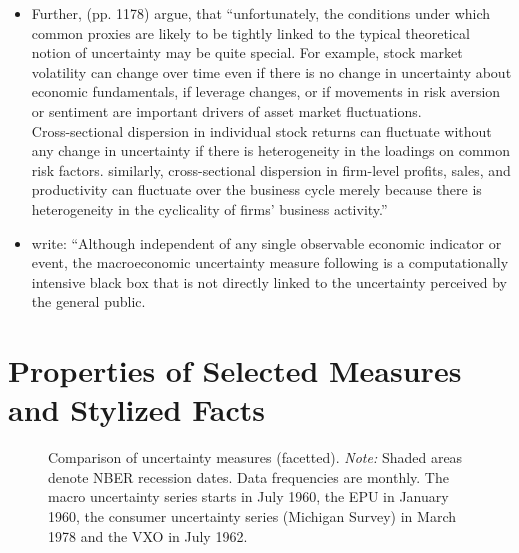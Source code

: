 \documentclass[a4paper,11pt,listof=nochaptergap,oneside,pointednumbers,bibtotoc,bigheadings,liststotoc]{scrbook}
\begin{document}
\begin{itemize}
	\item Further, \citet{juradoetal:15} (pp. 1178) argue, that ``unfortunately, the conditions under which common proxies are likely to be tightly linked to the typical theoretical notion of uncertainty may be quite special. For example, stock market volatility can change over time even if there is no change in uncertainty about economic fundamentals, if leverage changes, or if movements in risk aversion or sentiment are important drivers of asset market fluctuations.\\
Cross-sectional dispersion in individual stock returns can fluctuate without any change in uncertainty if there is heterogeneity in the loadings on common risk factors. similarly, cross-sectional dispersion in firm-level profits, sales, and productivity can fluctuate over the business cycle merely because there is heterogeneity in the cyclicality of firms' business activity.'' 
	\item \citet[p. 13]{bontempietal:16} write: ``Although independent of any single observable economic indicator or event, the macroeconomic uncertainty measure following \citet{juradoetal:15} is a computationally intensive black box that is not directly linked to the uncertainty perceived by the general public.  
\end{itemize}

\section{Properties of Selected Measures and Stylized Facts}
\label{sec:ComparisonOfMeasures}
\begin{figure}[!ht]
   \centering
   \setlength\fboxsep{0pt}
   \setlength\fboxrule{0pt}
      \caption[Comparison of uncertainty measures (facetted).]{Comparison of uncertainty measures (facetted).
      \textit{Note:} Shaded areas denote NBER recession dates. Data frequencies are monthly. The macro uncertainty series starts in July 1960, the EPU in January 1960, the consumer uncertainty series (Michigan Survey) in March 1978 and the VXO in July 1962.}   \label{fig:comparison_plot}
\end{figure}
\end{document}

